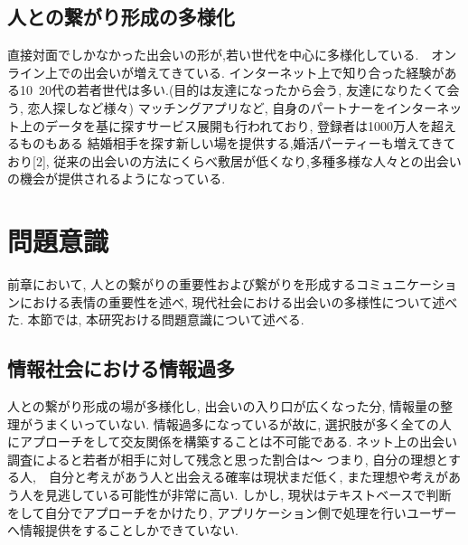 \subsection{人との繋がり形成の多様化}
直接対面でしかなかった出会いの形が,若い世代を中心に多様化している.　オンライン上での出会いが増えてきている.
インターネット上で知り合った経験がある10~20代の若者世代は多い.(目的は友達になったから会う, 友達になりたくて会う, 恋人探しなど様々)
マッチングアプリなど, 自身のパートナーをインターネット上のデータを基に探すサービス展開も行われており, 登録者は1000万人を超えるものもある
結婚相手を探す新しい場を提供する,婚活パーティーも増えてきており[2],
従来の出会いの方法にくらべ敷居が低くなり,多種多様な人々との出会いの機会が提供されるようになっている.

\section{問題意識}
前章において, 人との繋がりの重要性および繋がりを形成するコミュニケーションにおける表情の重要性を述べ,
現代社会における出会いの多様性について述べた.
本節では, 本研究おける問題意識について述べる.
\subsection{情報社会における情報過多}
人との繋がり形成の場が多様化し, 出会いの入り口が広くなった分, 情報量の整理がうまくいっていない.
情報過多になっているが故に, 選択肢が多く全ての人にアプローチをして交友関係を構築することは不可能である.
ネット上の出会い調査によると若者が相手に対して残念と思った割合は〜%
つまり, 自分の理想とする人,　自分と考えがあう人と出会える確率は現状まだ低く, また理想や考えがあう人を見逃している可能性が非常に高い.
しかし, 現状はテキストベースで判断をして自分でアプローチをかけたり, アプリケーション側で処理を行いユーザーへ情報提供をすることしかできていない.


